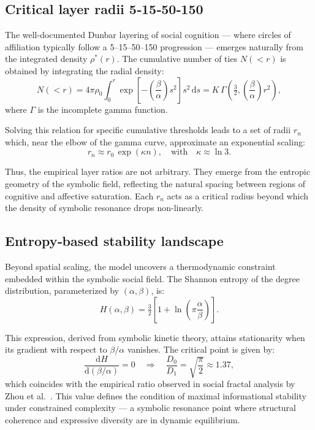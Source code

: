 \subsection{Critical layer radii 5‑15‑50‑150}\label{sec:layers}

The well-documented Dunbar layering of social cognition — where circles of affiliation typically follow a 5–15–50–150 progression — emerges naturally from the integrated density \(\rho^\ast(r)\). The cumulative number of ties \(N(<r)\) is obtained by integrating the radial density:
\[
N(<r) = 4\pi \rho_0 \int_{0}^{r} \exp\left[-\left(\frac{\beta}{\alpha}\right)s^2\right]s^2\,\mathrm{d}s = K\,\Gamma\!\left(\tfrac{3}{2}, \left(\frac{\beta}{\alpha}\right)r^2\right),
\]
where \(\Gamma\) is the incomplete gamma function.

Solving this relation for specific cumulative thresholds leads to a set of radii \(r_n\) which, near the elbow of the gamma curve, approximate an exponential scaling:
\begin{equation}
r_n \approx r_0\,\exp(\kappa n),\quad \text{with} \quad \kappa \approx \ln 3.
\end{equation}

Thus, the empirical layer ratios are not arbitrary. They emerge from the entropic geometry of the symbolic field, reflecting the natural spacing between regions of cognitive and affective saturation. Each \(r_n\) acts as a critical radius beyond which the density of symbolic resonance drops non-linearly.

\subsection{Entropy‑based stability landscape}\label{sec:entropyland}

Beyond spatial scaling, the model uncovers a thermodynamic constraint embedded within the symbolic social field. The Shannon entropy of the degree distribution, parameterized by \((\alpha, \beta)\), is:
\begin{equation}
H(\alpha, \beta) = \tfrac{3}{2}\left[1 + \ln\left(\pi \frac{\alpha}{\beta}\right)\right].
\end{equation}

This expression, derived from symbolic kinetic theory, attains stationarity when its gradient with respect to \(\beta/\alpha\) vanishes. The critical point is given by:
\[
\frac{\mathrm{d}H}{\mathrm{d}(\beta/\alpha)} = 0 \quad \Rightarrow \quad \frac{D_0}{D_1} = \sqrt{\frac{\pi}{2}} \approx 1.37,
\]
which coincides with the empirical ratio observed in social fractal analysis by Zhou et al.~\cite{zhou2005}. This value defines the condition of maximal informational stability under constrained complexity — a symbolic resonance point where structural coherence and expressive diversity are in dynamic equilibrium.

